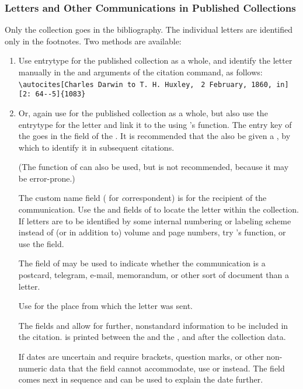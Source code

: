 \documentclass{ltxdockit}[2010/02/12]
\begin{document}
\subsubsection{Letters and Other Communications in Published Collections}\label{publishedletters}
Only the collection goes in the bibliography. The individual letters are identified only in the footnotes. Two methods are available:
\begin{enumerate}
\item Use entrytype  for the published collection as a whole, and identify the letter manually in the  and  arguments of the citation command, as follows:\autocites[Charles Darwin to T. H. Huxley, 2 February, 1860, in][2:~64--5]{1083}
\verb|\autocites[Charles Darwin to T. H. Huxley,|
\verb| 2 February, 1860, in][2: 64--5]{1083}|

\item Or, again use  for the published collection as a whole, but also use the entrytype  for the letter and link it to the  using 's  function. The entry key of the  goes in the  field of the .\autocites[][]{2319y,2632x}
It is recommended that the  also be given a , by which to identify it in subsequent citations.\autocites[][]{2319x}

(The  function of \bibtex can also be used, but is not recommended, because it may be error-prone.)

The custom name field  ( for \emph{c}orrespondent) is for the recipient of the communication.
Use the  and  fields of  to locate the letter within the collection. 
If letters are to be identified by some internal numbering or labeling scheme instead of (or in addition to) volume and page numbers, try 's  function, or use the  field.

The field  of  may be used to indicate whether the communication is a postcard, telegram, e-mail, memorandum, or other sort of document than a letter. 

Use  for the place from which the letter was sent.

The fields  and  allow for further, nonstandard information to be included in the citation.  is printed between the  and the , and  after the collection data.

If dates are uncertain and require brackets, question marks, or other non-numeric data that the  field cannot accommodate, use  or  instead. The  field comes next in sequence and can be used to explain the date further.


\end{enumerate}
\end{document}
